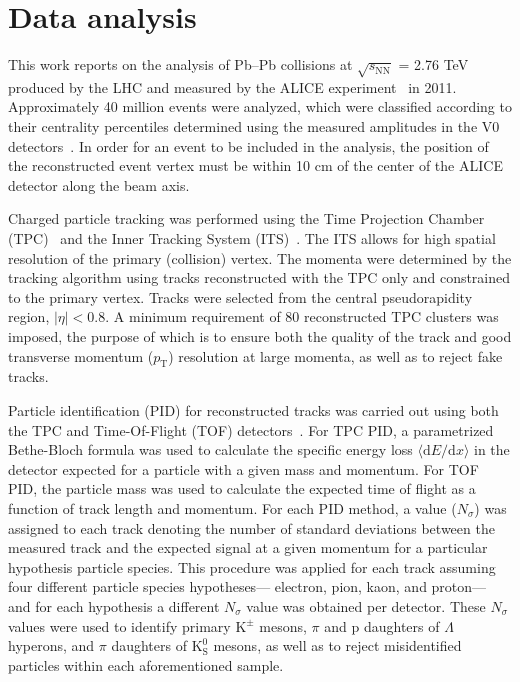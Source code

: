 \documentclass[ALICE,manyauthors]{cernphprep}
\newcommand{\pt}{$p_{\mathrm{T}}$\xspace}
\newcommand{\Lam}{$\Lambda$\xspace}
\newcommand{\Kpm}{$\mathrm{K^{\pm}}$\xspace}
\newcommand{\Ks}{$\mathrm{K^{0}_{S}}$\xspace}
\begin{document}
\section{Data analysis}
\label{sec:DataAnalysis}

This work reports on the analysis of Pb--Pb collisions at $\sqrt{s_{\mathrm{NN}}}$ = 2.76 TeV produced by the LHC and measured by the ALICE experiment~\cite{Aamodt:2008zz} in 2011.
Approximately 40 million events were analyzed, which were classified according to their centrality percentiles determined using the measured amplitudes in the V0 detectors~\cite{Abelev:2013qoq}.  
In order for an event to be included in the analysis, the position of the reconstructed event vertex must be within 10 cm of the center of the ALICE detector along the beam axis. 

Charged particle tracking was performed using the Time Projection Chamber (TPC)~\cite{2010NIMPA.622..316A} and the Inner Tracking System (ITS)~\cite{Abelevetal:2014dna}.  
The ITS allows for high spatial resolution of the primary (collision) vertex.
The momenta were determined by the tracking algorithm using tracks reconstructed with the TPC only and constrained to the primary vertex.
Tracks were selected from the central pseudorapidity region, $|\eta| < 0.8$.
A minimum requirement of 80 reconstructed TPC clusters was imposed, the purpose of which is to ensure both the quality of the track and good transverse momentum (\pt) resolution at large momenta, as well as to reject fake tracks.

Particle identification (PID) for reconstructed tracks was carried out using both the TPC and Time-Of-Flight (TOF) detectors~\cite{Abelev:2014ffa, Akindinov:2013tea}.  
For TPC PID, a parametrized Bethe-Bloch formula was used to calculate the specific energy loss $\langle \mathrm{d}E/\mathrm{d}x \rangle$ in the detector expected for a particle with a given mass and momentum.  
For TOF PID, the particle mass was used to calculate the expected time of flight as a function of track length and momentum.  
For each PID method, a value ($N_{\sigma}$) was assigned to each track denoting the number of standard deviations between the measured track and the expected signal at a given momentum for a particular hypothesis particle species.  
This procedure was applied for each track assuming four different particle species hypotheses--- electron, pion, kaon, and proton--- and for each hypothesis a different $N_{\sigma}$ value was obtained per detector.
These $N_{\sigma}$ values were used to identify primary \Kpm mesons, $\pi$ and p daughters of \Lam hyperons, and $\pi$ daughters of \Ks mesons, as well as to reject misidentified particles within each aforementioned sample.  
\end{document}
